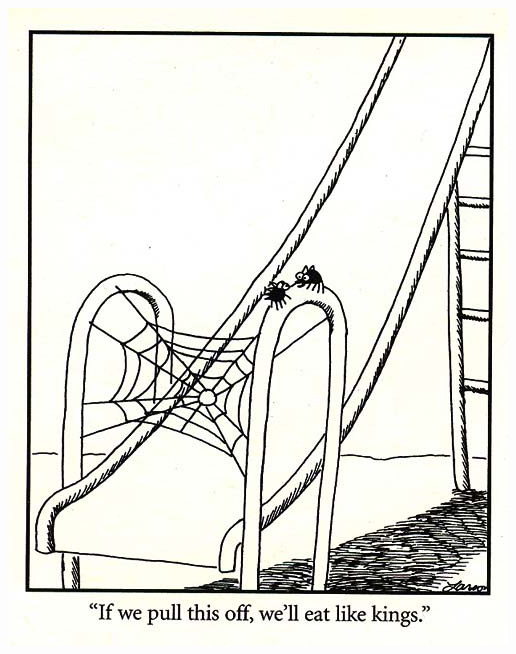 \documentclass{beamer}
\begin{document}
\begin{frame}
  \center \includegraphics[scale=1.0]{assets/kings}
\end{frame}
\end{document}
